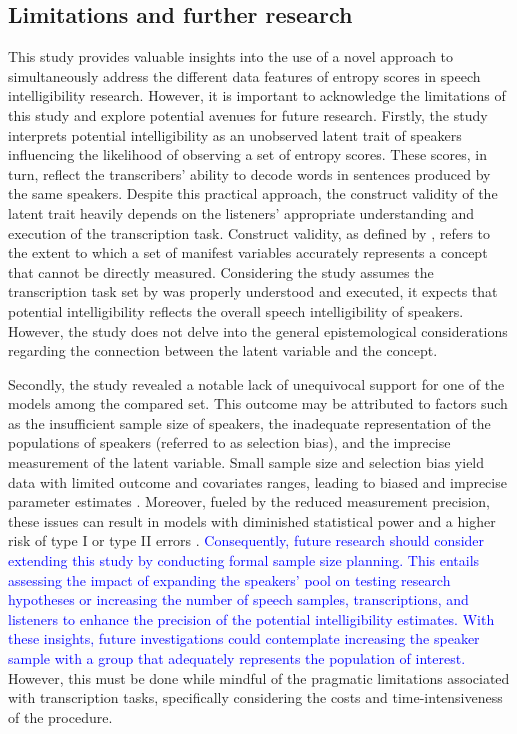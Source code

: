 \documentclass[
  authoryear,
  preprint,
  1p]{elsarticle}
\begin{document}
\subsection{Limitations and further research}\label{sec-D-LFR}

This study provides valuable insights into the use of a novel approach
to simultaneously address the different data features of entropy scores
in speech intelligibility research. However, it is important to
acknowledge the limitations of this study and explore potential avenues
for future research. Firstly, the study interprets potential
intelligibility as an unobserved latent trait of speakers influencing
the likelihood of observing a set of entropy scores. These scores, in
turn, reflect the transcribers' ability to decode words in sentences
produced by the same speakers. Despite this practical approach, the
construct validity of the latent trait heavily depends on the listeners'
appropriate understanding and execution of the transcription task.
Construct validity, as defined by \citet{Cronbach_et_al_1955}, refers to
the extent to which a set of manifest variables accurately represents a
concept that cannot be directly measured. Considering the study assumes
the transcription task set by \citet{Boonen_et_al_2021} was properly
understood and executed, it expects that potential intelligibility
reflects the overall speech intelligibility of speakers. However, the
study does not delve into the general epistemological considerations
regarding the connection between the latent variable and the concept.

Secondly, the study revealed a notable lack of unequivocal support for
one of the models among the compared set. This outcome may be attributed
to factors such as the insufficient sample size of speakers, the
inadequate representation of the populations of speakers (referred to as
selection bias), and the imprecise measurement of the latent variable.
Small sample size and selection bias yield data with limited outcome and
covariates ranges, leading to biased and imprecise parameter estimates
\citep{Everitt_et_al_2010}. Moreover, fueled by the reduced measurement
precision, these issues can result in models with diminished statistical
power and a higher risk of type I or type II errors
\citep{McElreath_2020}. \textcolor{blue}{Consequently, future research should consider
extending this study by conducting formal sample size planning. This
entails assessing the impact of expanding the speakers' pool on testing
research hypotheses or increasing the number of speech samples,
transcriptions, and listeners to enhance the precision of the potential
intelligibility estimates. With these insights, future investigations
could contemplate increasing the speaker sample with a group that
adequately represents the population of interest.} However, this must be
done while mindful of the pragmatic limitations associated with
transcription tasks, specifically considering the costs and
time-intensiveness of the procedure.
\end{document}
